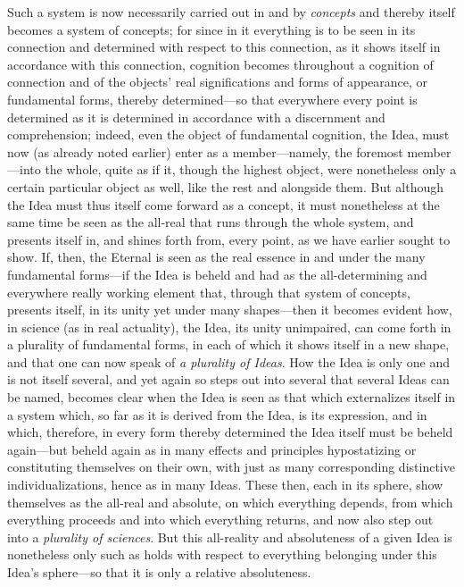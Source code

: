 \documentclass[12pt,a4paper]{book}
\begin{document}
Such a system is now necessarily carried out in and by \emph{concepts} and thereby
itself becomes a system of concepts; for since in it everything is to be seen in its
connection and determined with respect to this connection, as it shows itself in
accordance with this connection, cognition becomes throughout a cognition of connection
and of the objects' real significations and forms of appearance, or fundamental forms,
thereby determined---so that everywhere every point is determined as it is determined in
accordance with a discernment and comprehension; indeed, even the object of fundamental
cognition, the Idea, must now (as already noted earlier) enter as a member---namely, the
foremost member---into the whole, quite as if it, though the highest object, were
nonetheless only a certain particular object as well, like the rest and alongside them.
But although the Idea must thus itself come forward as a concept, it must nonetheless at
the same time be seen as the all-real that runs through the whole system, and presents
itself in, and shines forth from, every point, as we have earlier sought to show. If,
then, the Eternal is seen as the real essence in and under the many fundamental
forms---if the Idea is beheld and had as the all-determining and everywhere really
working element that, through that system of concepts, presents itself, in its unity yet
under many shapes---then it becomes evident how, in science (as in real actuality), the
Idea, its unity unimpaired, can come forth in a plurality of fundamental forms, in
each of which it shows itself in a new shape, and that one can now speak of
\emph{a plurality of Ideas}. How the Idea is only one and is not itself several, and yet
again so steps out into several that several Ideas can be named, becomes clear when the
Idea is seen as that which externalizes itself in a system which, so far as it is derived
from the Idea, is its expression, and in which, therefore, in every form thereby
determined the Idea itself must be beheld again---but beheld again as in many effects and
principles hypostatizing or constituting themselves on their own, with just as many
corresponding distinctive individualizations, hence as in many Ideas. These then, each in
its sphere, show themselves as the all-real and absolute, on which everything depends,
from which everything proceeds and into which everything returns, and now also step out
into a \emph{plurality of sciences}. But this all-reality and absoluteness of a given
Idea is nonetheless only such as holds with respect to everything belonging under this
Idea's sphere---so that it is only a relative absoluteness.
\end{document}
